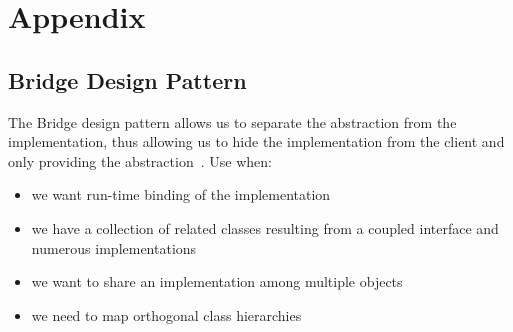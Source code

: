 \chapter{Appendix}

\section{Bridge Design Pattern}
The Bridge design pattern allows us to separate the abstraction from the implementation, thus
allowing us to hide the implementation from the client and only providing the abstraction~\citep{oodesign}.
Use when:
\begin{itemize}
	\item we want run-time binding of the implementation
	\item we have a collection of related classes resulting from a coupled interface and numerous
	implementations
	\item we want to share an implementation among multiple objects
	\item we need to map orthogonal class hierarchies
\end{itemize}